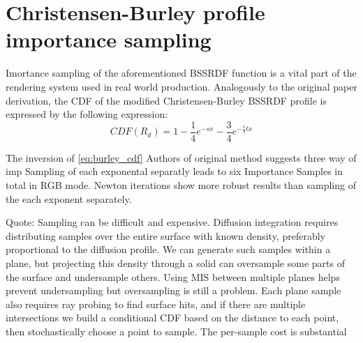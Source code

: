 \section{Christensen-Burley profile importance sampling}
\label{section:burley_importance}

Imortance sampling of the aforementioned BSSRDF function is a vital part of the
rendering system used in real world production. Analogously to the original
paper derivation, the \gls{CDF} of the modified Christensen-Burley \gls{BSSRDF}
profile is expressed by the following expression: 
\begin{equation}\label{eq:burley_cdf}
CDF(R_d) = 1-\frac{1}{4}e^{-sx}-\frac{3}{4}e^{-\frac{1}{3}tx}
\end{equation}

The inversion of \eqref{eq:burley_cdf} Authors of original method suggests three
way of imp Sampling of each exponental separatly leads to six Importance Samples in total
in RGB mode.
Newton iterations show more robust results than sampling of the each exponent
separately.

Quote: Sampling can be difficult and expensive. Diffusion
integration requires distributing samples over the entire surface with known
density, preferably proportional to the diffusion profile. We can generate
such samples within a plane, but projecting this density through a solid can
oversample some parts of the surface and undersample others. Using MIS between
multiple planes \cite{King:2013:BIS:2504459.2504520}  helps prevent
undersampling but oversampling is still a problem. Each plane sample also
requires ray probing to find surface hits, and if there are multiple
intersections we build a conditional CDF based on the distance to each point,
then stochastically choose a point to sample. The per-sample cost is substantial